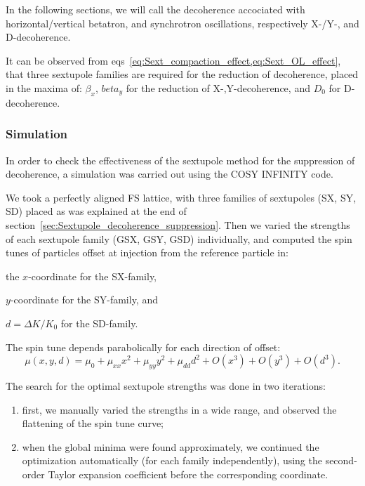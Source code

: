 \documentclass{article}
\begin{document}
In the following sections, we will call the decoherence accociated with horizontal/vertical betatron, and synchrotron oscillations, respectively X-/Y-, and D-decoherence. 

It can be observed from eqs~\cref{eq:Sext_compaction_effect,eq:Sext_OL_effect}, that three sextupole families are required for the reduction of decoherence, placed in the maxima of: $\beta_x$, $beta_y$ for the reduction of X-,Y-decoherence, and $D_0$ for D-decoherence.

\subsubsection{Simulation}
In order to check the effectiveness of the sextupole method for the suppression of decoherence, a simulation was carried out using the COSY INFINITY code.

We took a perfectly aligned FS lattice, with three families of sextupoles (SX, SY, SD) placed as was explained at the end of section~\ref{sec:Sextupole_decoherence_suppression}. Then we varied the strengths of each sextupole family (GSX, GSY, GSD) individually, and computed the spin tunes of particles offset at injection from the reference particle in:
\begin{inparaenum}
\item the $x$-coordinate for the SX-family,
\item $y$-coordinate for the SY-family, and
\item $d=\Delta K/K_0$ for the SD-family.
\end{inparaenum}

The spin tune depends parabolically for each direction of offset:
\[
\mu(x,y,d) = \mu_0 + \mu_{xx}x^2 + \mu_{yy}y^2 + \mu_{dd}d^2 + O(x^3) + O(y^3) + O(d^3).
\]

The search for the optimal sextupole strengths was done in two iterations:
\begin{enumerate}
\item first, we manually varied the strengths in a wide range, and observed the flattening of the spin tune curve;
\item when the global minima were found approximately, we continued the optimization automatically (for each family independently), using the second-order Taylor expansion coefficient before the corresponding coordinate.
\end{enumerate}
\end{document}
